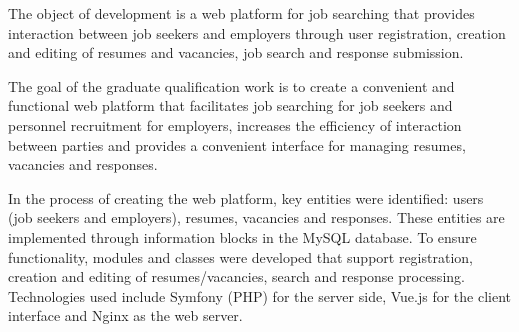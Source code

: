 The object of development is a web platform for job searching that provides interaction between job seekers and employers through user registration, creation and editing of resumes and vacancies, job search and response submission.

The goal of the graduate qualification work is to create a convenient and functional web platform that facilitates job searching for job seekers and personnel recruitment for employers, increases the efficiency of interaction between parties and provides a convenient interface for managing resumes, vacancies and responses.

In the process of creating the web platform, key entities were identified: users (job seekers and employers), resumes, vacancies and responses. These entities are implemented through information blocks in the MySQL database. To ensure functionality, modules and classes were developed that support registration, creation and editing of resumes/vacancies, search and response processing. Technologies used include Symfony (PHP) for the server side, Vue.js for the client interface and Nginx as the web server.
